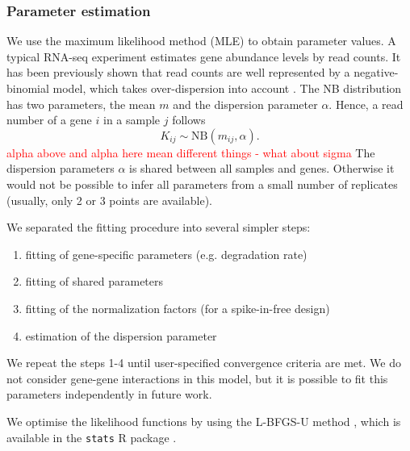 \subsubsection*{Parameter estimation}
We use the maximum likelihood method (MLE) to obtain parameter values.
A typical RNA-seq experiment estimates gene abundance levels by read counts.
It has been previously shown that read counts are well represented by a negative-binomial model,
which takes over-dispersion into account 
\citep{robinson2007moderated}.
The NB distribution has two parameters, the mean $m$ and the dispersion parameter 
$\alpha$.
Hence,  a read number of a gene $i$ in a sample $j$ follows
\begin{equation}
 K_{ij} \sim \text{NB}(m_{ij}, \alpha).
\end{equation}
\textcolor{red}{alpha above and alpha here mean different things - what about sigma}
The dispersion parameters $\alpha$ is shared between all
samples and genes. Otherwise it would not be possible to infer all parameters 
from a small number of replicates (usually, only 2 or 3 points are available).

We separated the fitting procedure into several simpler steps:
\begin{enumerate}
 \item fitting of gene-specific parameters (e.g. degradation rate)
 \item fitting of shared parameters  
 \item fitting of the normalization factors (for a spike-in-free design)
 \item estimation of the dispersion parameter 
\end{enumerate}
We repeat the steps 1-4 until user-specified convergence criteria are met.
We do not consider gene-gene interactions in this model, but it is possible to 
 fit this parameters independently in future work. 

We optimise the likelihood functions by using the {L-BFGS-U} method \citep{byrd1995limited}, which is
available in the \verb|stats| R package \citep{rlang}.